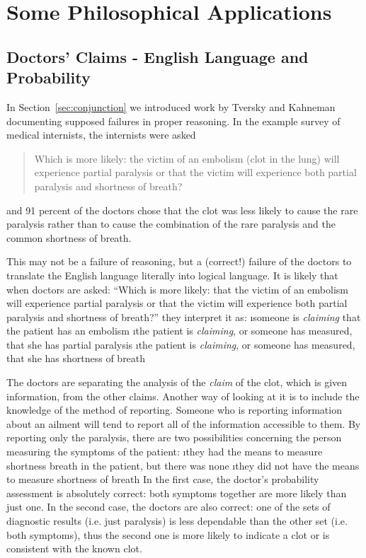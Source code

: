 

\section{Some Philosophical Applications}

\subsection{Doctors' Claims - English Language and Probability}

In Section~\ref{sec:conjunction} we introduced work by Tversky and Kahneman documenting supposed failures in proper reasoning.  In the example survey of medical internists, the internists were asked 
\begin{quote}
Which is more likely: the victim of an embolism (clot in the lung) will experience partial paralysis or that the victim will experience both partial paralysis and shortness of breath?
\end{quote}
and 91 percent of the doctors chose that the clot was less likely to cause the rare paralysis rather than to cause the combination of the rare paralysis and the common shortness of breath.  

This may not be a failure of reasoning, but a (correct!) failure of the doctors to translate the English language literally into logical language.  It is likely that when doctors are asked: ``Which is more likely: that the victim of an embolism will experience partial paralysis or that the victim will experience both partial paralysis and shortness of breath?'' they interpret it as:
\be
\i someone is {\em claiming} that the patient has an embolism
\i the patient is {\em claiming}, or someone has measured, that she has partial paralysis
\i the patient is {\em claiming}, or someone has measured, that she has shortness of breath
\ee

The doctors are separating the analysis of the \emph{claim} of the clot, which is given information, from the other claims. Another way of looking at it is to include the knowledge of the method of reporting. Someone who is reporting information about an ailment will tend to report all of the information accessible to them. By reporting only the paralysis, there are two possibilities concerning the person measuring the symptoms of the patient:
\be
\i they had the means to measure shortness breath in the patient, but there was none
\i they did not have the means to measure shortness of breath
\ee
In the first case, the doctor's probability assessment is absolutely correct: both symptoms together are more likely than just one. In the second case, the doctors are also correct: one of the sets of diagnostic results (i.e. just paralysis) is less dependable than the other set (i.e. both symptoms), thus the second one is more likely to indicate a clot or is consistent with the known clot.


